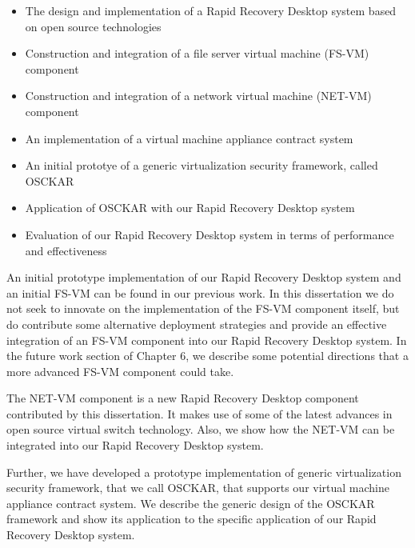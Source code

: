 \begin{itemize}

\item The design and implementation of a Rapid Recovery Desktop system based on open source technologies 

\item Construction and integration of a file server virtual machine (FS-VM) component

\item Construction and integration of a network virtual machine (NET-VM) component

\item An implementation of a virtual machine appliance contract system

\item An initial prototye of a generic virtualization security framework, called OSCKAR

\item Application of OSCKAR with our Rapid Recovery Desktop system

\item Evaluation of our Rapid Recovery Desktop system in terms of performance and effectiveness

\end{itemize}

An initial prototype implementation of our Rapid Recovery Desktop system and an initial FS-VM can be found in our previous work\cite{rapid_recovery_paper_05}. In this dissertation we do not seek to innovate on the implementation of the FS-VM component itself, but do contribute some alternative deployment strategies and provide an effective integration of an FS-VM component into our Rapid Recovery Desktop system. In the future work section of Chapter 6, we describe some potential directions that a more advanced FS-VM component could take.

The NET-VM component is a new Rapid Recovery Desktop component contributed by this dissertation. It makes use of some of the latest advances in open source virtual switch technology. Also, we show how the NET-VM can be integrated into our Rapid Recovery Desktop system.

Further, we have developed a prototype implementation of generic virtualization security framework, that we call OSCKAR, that supports our virtual machine appliance contract system. We describe the generic design of the OSCKAR framework and show its application to the specific application of our Rapid Recovery Desktop system.


